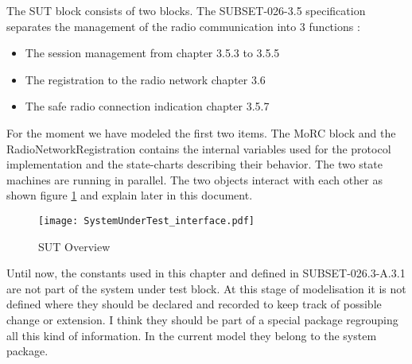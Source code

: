The SUT block consists of two blocks. The SUBSET-026-3.5
specification  separates the management of the radio communication into
3 functions :
\begin{itemize}
\item The session management from chapter 3.5.3 to 3.5.5
\item The registration to the radio network chapter 3.6
\item The safe radio connection indication chapter 3.5.7
\end{itemize}

For the moment we have modeled  the first two items.
The MoRC block and the RadioNetworkRegistration
contains the internal variables used for the protocol implementation and the
state-charts describing their behavior.  The two state machines are
running in parallel.
The two objects interact with each other as shown figure
\ref{fig:sut_interface} and explain later in this document.
\begin{figure}[htpb]
\centering
\texttt{[image: SystemUnderTest\_interface.pdf]}
\caption{\label{fig:sut_interface} SUT Overview}
\end{figure}

Until now, the constants used in this chapter and defined in
SUBSET-026.3-A.3.1 are not part of the system under test  block. At this stage of modelisation
it is not defined where they should be declared and recorded to keep track of
possible change or extension. I think they should be part of a special package
regrouping all this kind of information. In the current model they belong to the
system package. 
